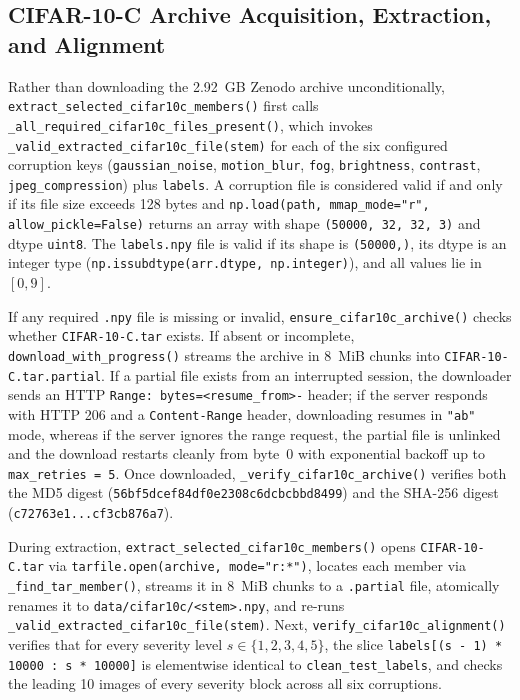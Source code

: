 \documentclass[11pt,a4paper]{article}
\begin{document}
\subsection{CIFAR-10-C Archive Acquisition, Extraction, and Alignment}
Rather than downloading the 2.92~GB Zenodo archive unconditionally, \texttt{extract\_\allowbreak{}selected\_\allowbreak{}cifar10c\_\allowbreak{}members()} first calls \texttt{\_\allowbreak{}all\_\allowbreak{}required\_\allowbreak{}cifar10c\_\allowbreak{}files\_\allowbreak{}present()}, which invokes \texttt{\_\allowbreak{}valid\_\allowbreak{}extracted\_\allowbreak{}cifar10c\_\allowbreak{}file(stem)} for each of the six configured corruption keys (\texttt{gaussian\_\allowbreak{}noise}, \texttt{motion\_\allowbreak{}blur}, \texttt{fog}, \texttt{brightness}, \texttt{contrast}, \texttt{jpeg\_\allowbreak{}compression}) plus \texttt{labels}. A corruption file is considered valid if and only if its file size exceeds 128 bytes and \texttt{np.load(path, mmap\_\allowbreak{}mode="r", allow\_\allowbreak{}pickle=False)} returns an array with shape \texttt{(50000, 32, 32, 3)} and dtype \texttt{uint8}. The \texttt{labels.npy} file is valid if its shape is \texttt{(50000,)}, its dtype is an integer type (\texttt{np.issubdtype(arr.dtype, np.integer)}), and all values lie in $[0, 9]$.

If any required \texttt{.npy} file is missing or invalid, \texttt{ensure\_\allowbreak{}cifar10c\_\allowbreak{}archive()} checks whether \texttt{CIFAR-10-C.tar} exists. If absent or incomplete, \texttt{download\_\allowbreak{}with\_\allowbreak{}progress()} streams the archive in 8~MiB chunks into \texttt{CIFAR-10-C.tar.partial}. If a partial file exists from an interrupted session, the downloader sends an HTTP \texttt{Range: bytes=<resume\_\allowbreak{}from>-} header; if the server responds with HTTP 206 and a \texttt{Content-Range} header, downloading resumes in \texttt{"ab"} mode, whereas if the server ignores the range request, the partial file is unlinked and the download restarts cleanly from byte~0 with exponential backoff up to \texttt{max\_\allowbreak{}retries = 5}. Once downloaded, \texttt{\_\allowbreak{}verify\_\allowbreak{}cifar10c\_\allowbreak{}archive()} verifies both the MD5 digest (\texttt{56bf5dcef84df0e2308c6dcbcbbd8499}) and the SHA-256 digest (\texttt{c72763e1...cf3cb876a7}).

During extraction, \texttt{extract\_\allowbreak{}selected\_\allowbreak{}cifar10c\_\allowbreak{}members()} opens \texttt{CIFAR-10-C.tar} via \texttt{tarfile.open(archive, mode="r:*")}, locates each member via \texttt{\_\allowbreak{}find\_\allowbreak{}tar\_\allowbreak{}member()}, streams it in 8~MiB chunks to a \texttt{.partial} file, atomically renames it to \texttt{data/\allowbreak{}cifar10c/\allowbreak{}<stem>.npy}, and re-runs \texttt{\_\allowbreak{}valid\_\allowbreak{}extracted\_\allowbreak{}cifar10c\_\allowbreak{}file(stem)}. Next, \texttt{verify\_\allowbreak{}cifar10c\_\allowbreak{}alignment()} verifies that for every severity level $s \in \{1, 2, 3, 4, 5\}$, the slice \texttt{labels[(s - 1) * 10000 : s * 10000]} is elementwise identical to \texttt{clean\_\allowbreak{}test\_\allowbreak{}labels}, and checks the leading 10 images of every severity block across all six corruptions.
\end{document}
